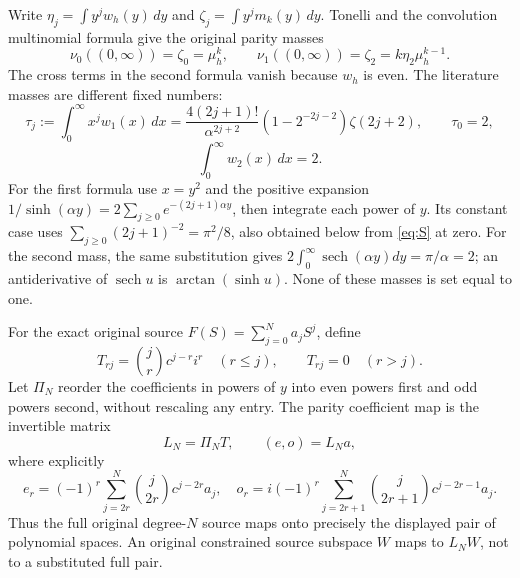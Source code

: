 \documentclass[11pt]{article}
\begin{document}
Write $\eta_j=\int y^jw_h(y)\,dy$ and
$\zeta_j=\int y^jm_k(y)\,dy$. Tonelli and the convolution
multinomial formula give the original parity masses
\begin{equation}\label{eq:masses}
 \nu_0((0,\infty))=\zeta_0=\mu_h^k,
 \qquad \nu_1((0,\infty))=\zeta_2=k\eta_2\mu_h^{k-1}.
\end{equation}
The cross terms in the second formula vanish because $w_h$ is
even. The literature masses are different fixed numbers:
\begin{equation}\label{eq:raw-moments}
 \tau_j:=\int_0^\infty x^j w_1(x)\,dx
 =\frac{4(2j+1)!}{\alpha^{2j+2}}
        (1-2^{-2j-2})\zeta(2j+2),\qquad \tau_0=2,
\end{equation}
\[
 \int_0^\infty w_2(x)\,dx=2.
\]
For the first formula use $x=y^2$ and the positive expansion
$1/\sinh(\alpha y)=2\sum_{j\geq0}e^{-(2j+1)\alpha y}$,
then integrate each power of $y$. Its constant case uses
$\sum_{j\geq0}(2j+1)^{-2}=\pi^2/8$, also obtained below from
\eqref{eq:S} at zero. For the second mass, the same substitution
gives $2\int_0^\infty\operatorname{sech}(\alpha y)dy=\pi/\alpha=2$;
an antiderivative of $\operatorname{sech} u$ is
$\arctan(\sinh u)$. None of these masses is set equal to one.

For the exact original source $F(S)=\sum_{j=0}^Na_jS^j$, define
\[
 T_{rj}=\binom jr c^{j-r}i^r\quad(r\leq j),\qquad T_{rj}=0\quad(r>j).
\]
Let $\Pi_N$ reorder the coefficients in powers of $y$ into even
powers first and odd powers second, without rescaling any entry.
The parity coefficient map is the invertible matrix
\begin{equation}\label{eq:source-map}
 L_N=\Pi_NT,\qquad (e,o)=L_Na,
\end{equation}
where explicitly
\[
 e_r=(-1)^r\sum_{j=2r}^N\binom j{2r}c^{j-2r}a_j,
 \quad
 o_r=i(-1)^r\sum_{j=2r+1}^N\binom j{2r+1}c^{j-2r-1}a_j.
\]
Thus the full original degree-$N$ source maps onto precisely the
displayed pair of polynomial spaces. An original constrained
source subspace $W$ maps to $L_NW$, not to a substituted full pair.
\end{document}
